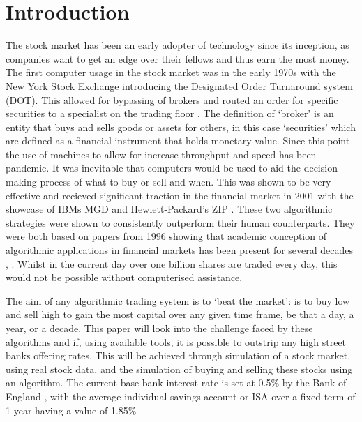\documentclass[conference]{IEEEtran}
\begin{document}

\section{Introduction}

The stock market has been an early adopter of technology since its inception, as companies want to get an edge over their fellows and thus earn the most money. The first computer usage in the stock market was in the early 1970s with the New York Stock Exchange introducing  the Designated Order Turnaround system (DOT). This allowed for bypassing of brokers and routed an order for specific securities to a specialist on the trading floor \cite{Hasbrouck}. The definition of `broker' is an entity that buys and sells goods or assets for others, in this case `securities' which are defined as a financial instrument that holds monetary value. Since this point the use of machines to allow for increase throughput and speed has been pandemic. It was inevitable that computers would be used to aid the decision making process of what to buy or sell and when. This was shown to be very effective and recieved significant traction in the financial market in 2001 with the showcase of IBMs MGD and  Hewlett-Packard's ZIP \cite{Tesauro2001}. These two algorithmic strategies were shown to consistently outperform their human counterparts. They were both based on papers from 1996 showing that academic conception of algorithmic applications in financial markets has been present for several decades \cite{Gjerstad1998}, \cite{Cliff1998}. Whilst in the current day over one billion shares are traded every day, this would not be possible without computerised assistance. 

The aim of any algorithmic trading system is to `beat the market': is to buy low and sell high to gain the most capital over any given time frame, be that a day, a year, or a decade. This paper will look into the challenge faced by these algorithms and if, using available tools, it is possible to outstrip any high street banks offering rates. This will be achieved through simulation of a stock market, using real stock data, and the simulation of buying and selling these stocks using an algorithm. The current base bank interest rate is set at 0.5\% by the Bank of England \cite{BankofEngland2014}, with the average individual savings account or ISA over a fixed term of 1 year having a value of 1.85\% \cite{Murray2018}
\end{document}
